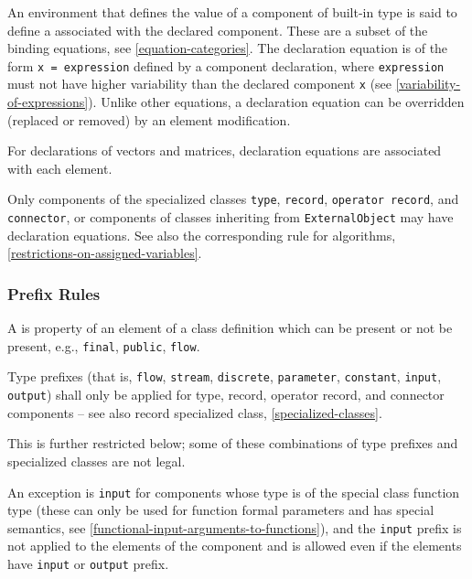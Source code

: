 An environment that defines the value of a component of built-in type is said to define a  associated with the declared component.
These are a subset of the binding equations, see \cref{equation-categories}.
The declaration equation is of the form \lstinline!x = expression! defined by a component declaration, where \lstinline!expression! must not have higher variability than the declared component \lstinline!x! (see \cref{variability-of-expressions}).
Unlike other equations, a declaration equation can be overridden (replaced or removed) by an element modification.

For declarations of vectors and matrices, declaration equations are associated with each element.

Only components of the specialized classes \lstinline!type!, \lstinline!record!, \lstinline!operator record!, and \lstinline!connector!, or components of classes inheriting from \lstinline!ExternalObject! may have declaration equations.
See also the corresponding rule for algorithms, \cref{restrictions-on-assigned-variables}.

\subsubsection{Prefix Rules}\label{prefix-rules}

A  is property of an element of a class definition which can be present or not be present, e.g., \lstinline!final!, \lstinline!public!, \lstinline!flow!.

Type prefixes (that is, \lstinline!flow!, \lstinline!stream!, \lstinline!discrete!, \lstinline!parameter!, \lstinline!constant!, \lstinline!input!, \lstinline!output!) shall only be applied for type, record, operator record, and connector components -- see also record specialized class, \cref{specialized-classes}.

This is further restricted below; some of these combinations of type prefixes and specialized classes are not legal.

An exception is \lstinline!input! for components whose type is of the special class function type (these can only be used for function formal parameters and has special semantics, see \cref{functional-input-arguments-to-functions}), and the \lstinline!input! prefix is not applied to the elements of the component and is allowed even if the elements have \lstinline!input! or \lstinline!output! prefix.

